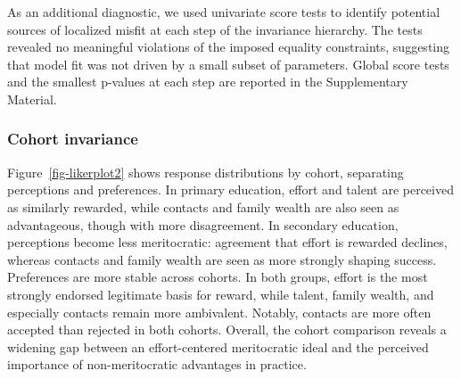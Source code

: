 \documentclass[
  13pt,
]{article}
\begin{document}
\begin{table}

\caption{\label{tbl-longinv}Longitudinal invariance results}


\end{table}%

As an additional diagnostic, we used univariate score tests to identify
potential sources of localized misfit at each step of the invariance
hierarchy. The tests revealed no meaningful violations of the imposed
equality constraints, suggesting that model fit was not driven by a
small subset of parameters. Global score tests and the smallest p-values
at each step are reported in the Supplementary Material.

\subsubsection{Cohort invariance}\label{cohort-invariance}

Figure~\ref{fig-likerplot2} shows response distributions by cohort,
separating perceptions and preferences. In primary education, effort and
talent are perceived as similarly rewarded, while contacts and family
wealth are also seen as advantageous, though with more disagreement. In
secondary education, perceptions become less meritocratic: agreement
that effort is rewarded declines, whereas contacts and family wealth are
seen as more strongly shaping success. Preferences are more stable
across cohorts. In both groups, effort is the most strongly endorsed
legitimate basis for reward, while talent, family wealth, and especially
contacts remain more ambivalent. Notably, contacts are more often
accepted than rejected in both cohorts. Overall, the cohort comparison
reveals a widening gap between an effort-centered meritocratic ideal and
the perceived importance of non-meritocratic advantages in practice.
\end{document}
